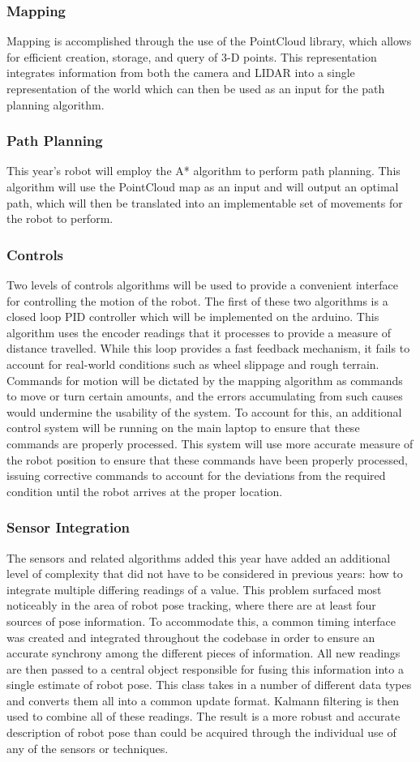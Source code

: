 \subsubsection{Mapping}
Mapping is accomplished through the use of the PointCloud library, which allows for efficient creation, storage, and query of 3-D points. This representation integrates information from both the camera and LIDAR into a single representation of the world which can then be used as an input for the path planning algorithm.
\subsubsection{Path Planning}
This year's robot will employ the A* algorithm to perform path planning. This algorithm will use the PointCloud map as an input and will output an optimal path, which will then be translated into an implementable set of movements for the robot to perform.
\subsubsection{Controls}
Two levels of controls algorithms will be used to provide a convenient interface for controlling the motion of the robot. The first of these two algorithms is a closed loop PID controller which will be implemented on the arduino. This algorithm uses the encoder readings that it processes to provide a measure of distance travelled. While this loop provides a fast feedback mechanism, it fails to account for real-world conditions such as wheel slippage and rough terrain. Commands for motion will be dictated by the mapping algorithm as commands to move or turn certain amounts, and the errors accumulating from such causes would undermine the usability of the system. To account for this, an additional control system will be running on the main laptop to ensure that these commands are properly processed. This system will use more accurate measure of the robot position to ensure that these commands have been properly processed, issuing corrective commands to account for the deviations from the required condition until the robot arrives at the proper location.
\subsubsection{Sensor Integration}
The sensors and related algorithms added this year have added an additional level of complexity that did not have to be considered in previous years: how to integrate multiple differing readings of a value. This problem surfaced most noticeably in the area of robot pose tracking, where there are at least four sources of pose information. To accommodate this, a common timing interface was created and integrated throughout the codebase in order to ensure an accurate synchrony among the different pieces of information. All new readings are then passed to a central object responsible for fusing this information into a single estimate of robot pose. This class takes in a number of different data types and converts them all into a common update format. Kalmann filtering is then used to combine all of these readings. The result is a more robust and accurate description of robot pose than could be acquired through the individual use of any of the sensors or techniques.